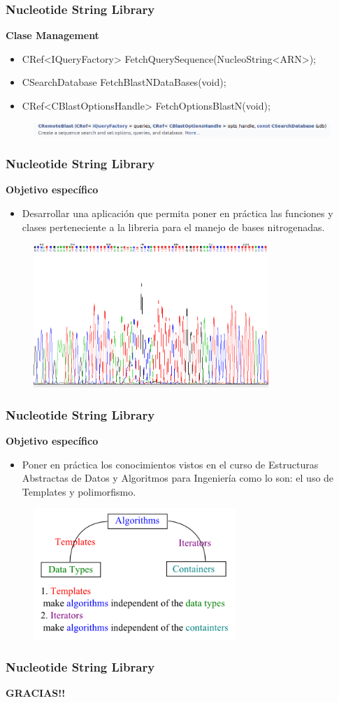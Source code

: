 \documentclass{beamer}
\begin{document}
\begin{frame}
\frametitle{Nucleotide String Library}
\textbf{\large{Clase Management}}
\begin{itemize}
\item{CRef<IQueryFactory> FetchQuerySequence(NucleoString<ARN>);}
\item{CSearchDatabase FetchBlastNDataBases(void);}
\item{CRef<CBlastOptionsHandle> FetchOptionsBlastN(void);}
\end{itemize}
\begin{figure}
		\includegraphics[width=4.7in]{remote.png}
\end{figure}
\end{frame}

\begin{frame}
\frametitle{Nucleotide String Library}
\textbf{\large{Objetivo específico}}
\begin{itemize}
\item Desarrollar una aplicación que permita poner en práctica las funciones y clases perteneciente a la libreria para el manejo de bases nitrogenadas.
\end{itemize}
\begin{figure}
		\includegraphics[width=3.5in]{2.png}
\end{figure}
\end{frame}

\begin{frame}
\frametitle{Nucleotide String Library}
\textbf{\large{Objetivo específico}}
\begin{itemize}
\item Poner en práctica los conocimientos vistos en el curso de Estructuras Abstractas de Datos y Algoritmos para Ingeniería como lo son: el uso de Templates y polimorfismo.
\end{itemize}
\begin{figure}
		\includegraphics[width=3.0in]{templates.png}
\end{figure}
\end{frame}

\begin{frame}
\frametitle{Nucleotide String Library}
\textbf{\large{GRACIAS!!}}
\end{frame}
\end{document}

